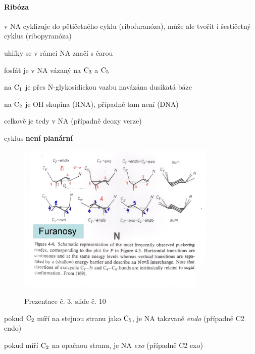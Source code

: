\documentclass[DIV=8]{scrreprt}
\begin{document}
\paragraph{Ribóza}
\begin{myItemize}[nosep]
    \item v NA cyklizuje do pětičetného cyklu (ribofuranóza), může ale tvořit i šestičetný cyklus (ribopyranóza)
    \item uhlíky se v rámci NA značí s čarou
\begin{myItemize}[nosep]
    \item fosfát je v NA vázaný na \(\ce{C3}\) a \(\ce{C5}\)
    \item na \(\ce{C1}\) je přes N-glykosidickou vazbu navázána dusíkatá báze
    \item na \(\ce{C2}\) je OH skupina (RNA), případně tam není (DNA)
\end{myItemize}

    \item celkově je tedy v NA (případně deoxy verze)
    \item cyklus \textbf{není planární} \begin{figure}
    \caption{Prezentace č. 3, slide č. 10}
    \includegraphics[width=0.85\textwidth]{slides-3/slide-10.jpg}
    \centering
    \label{slides-3-slide-10}
\end{figure}

\begin{myItemize}[nosep]
    \item pokud \(\ce{C2}\) míří na stejnou stranu jako \(\ce{C5}\), je NA takzvaně \emph{endo} (případně C2 endo)
    \item pokud míří \(\ce{C2}\) na opačnou stranu, je NA \emph{exo} (případně C2 exo)
\end{myItemize}

\end{myItemize}
\end{document}
